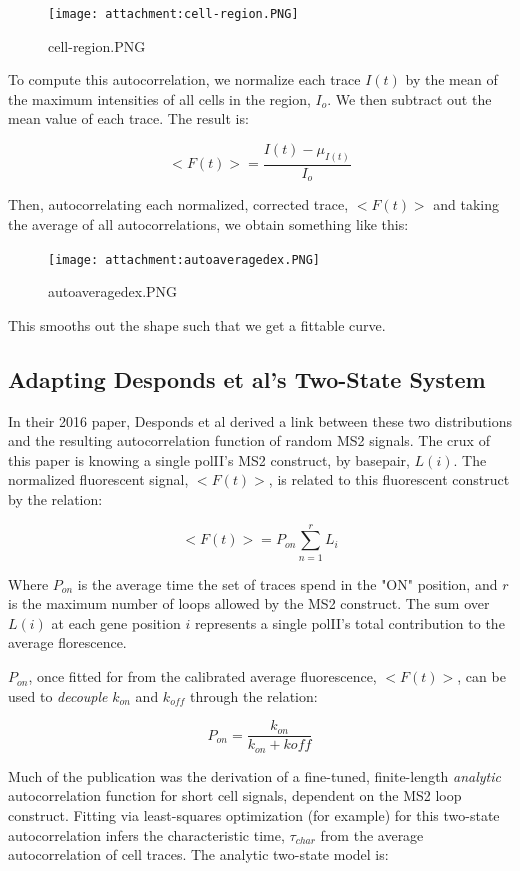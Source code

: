 \documentclass[11pt]{article}
\begin{document}
\begin{figure}
\centering
\texttt{[image: attachment:cell-region.PNG]}
\caption{cell-region.PNG}
\end{figure}

To compute this autocorrelation, we normalize each trace \(I(t)\) by the
mean of the maximum intensities of all cells in the region, \(I_o\). We
then subtract out the mean value of each trace. The result is:

\[ <F(t)> = \frac{I(t) - \mu_{I(t)}}{I_o} \]

Then, autocorrelating each normalized, corrected trace, \(<F(t)>\) and
taking the average of all autocorrelations, we obtain something like
this:

\begin{figure}
\centering
\texttt{[image: attachment:autoaveragedex.PNG]}
\caption{autoaveragedex.PNG}
\end{figure}

This smooths out the shape such that we get a fittable curve.

    \subsection{Adapting Desponds et al's Two-State
System}\label{adapting-desponds-et-als-two-state-system}

In their 2016 paper, Desponds et al derived a link between these two
distributions and the resulting autocorrelation function of random MS2
signals. The crux of this paper is knowing a single polII's MS2
construct, by basepair, \(L(i)\). The normalized fluorescent signal,
\(<F(t)>\), is related to this fluorescent construct by the relation:

\[<F(t)> = P_{on}\sum_{n=1}^{r} L_i \]

Where \(P_{on}\) is the average time the set of traces spend in the "ON"
position, and \(r\) is the maximum number of loops allowed by the MS2
construct. The sum over \(L(i)\) at each gene position \(i\) represents
a single polII's total contribution to the average florescence.

\(P_{on}\), once fitted for from the calibrated average fluorescence,
\(<F(t)>\), can be used to \emph{decouple} \(k_{on}\) and \(k_{off}\)
through the relation:

\[P_{on} = \frac{k_{on}}{k_{on} + k{off}} \]

Much of the publication was the derivation of a fine-tuned,
finite-length \emph{analytic} autocorrelation function for short cell
signals, dependent on the MS2 loop construct. Fitting via least-squares
optimization (for example) for this two-state autocorrelation infers the
characteristic time, \(\tau_{char}\) from the average autocorrelation of
cell traces. The analytic two-state model is:
\end{document}
